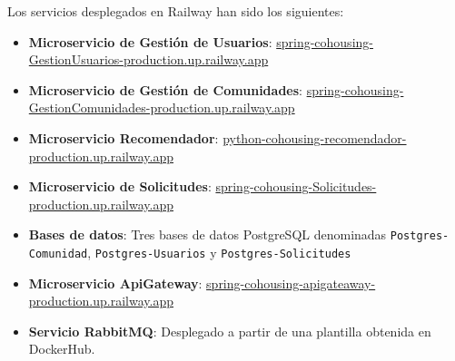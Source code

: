 \vspace{0.5em}
Los servicios desplegados en Railway han sido los siguientes:
\vspace{0.5em}
\begin{itemize} \item \textbf{Microservicio de Gestión de Usuarios}: \href{https://spring-cohousing-GestionUsuarios-production.up.railway.app}{spring-cohousing-GestionUsuarios-production.up.railway.app} \vspace{0.25em} \item \textbf{Microservicio de Gestión de Comunidades}: \href{https://spring-cohousing-GestionComunidades-production.up.railway.app}{spring-cohousing-GestionComunidades-production.up.railway.app} \vspace{0.25em} \item \textbf{Microservicio Recomendador}: \href{https://python-cohousing-recomendador-production.up.railway.app}{python-cohousing-recomendador-production.up.railway.app} \vspace{0.25em} \item \textbf{Microservicio de Solicitudes}: \href{https://spring-cohousing-Solicitudes-production.up.railway.app}{spring-cohousing-Solicitudes-production.up.railway.app} \vspace{0.25em} \item \textbf{Bases de datos}: Tres bases de datos PostgreSQL denominadas \texttt{Postgres-Comunidad}, \texttt{Postgres-Usuarios} y \texttt{Postgres-Solicitudes} \vspace{0.25em} \item \textbf{Microservicio ApiGateway}: \href{https://spring-cohousing-apigateaway-production.up.railway.app}{spring-cohousing-apigateaway-production.up.railway.app} \vspace{0.25em} \item \textbf{Servicio RabbitMQ}: Desplegado a partir de una plantilla obtenida en DockerHub. \end{itemize}


\vspace{0.5em}


